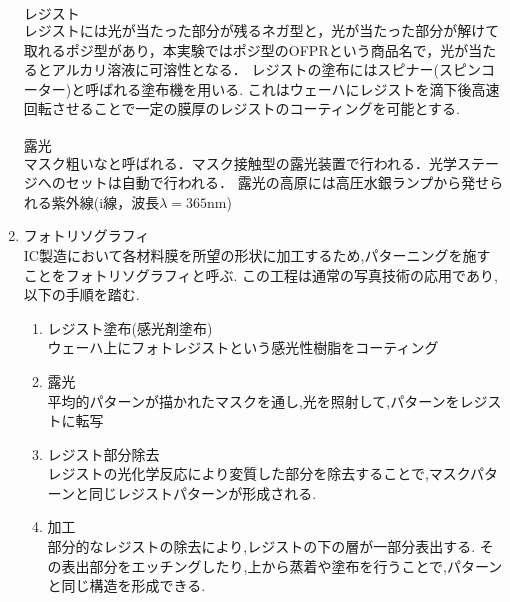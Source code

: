 \documentclass[11pt]{jarticle}
\begin{document}
\begin{enumerate}
				$\boldsymbol{レジスト}$\\
					レジストには光が当たった部分が残るネガ型と，光が当たった部分が解けて取れるポジ型があり，本実験ではポジ型のOFPRという商品名で，光が当たるとアルカリ溶液に可溶性となる．
					レジストの塗布にはスピナー(スピンコーター)と呼ばれる塗布機を用いる.
					これはウェーハにレジストを滴下後高速回転させることで一定の膜厚のレジストのコーティングを可能とする.\\
				\\
				$\boldsymbol{露光}$\\
					マスク粗いなと呼ばれる．マスク接触型の露光装置で行われる．光学ステージへのセットは自動で行われる．
					露光の高原には高圧水銀ランプから発せられる紫外線(i線，波長$\lambda = 365$nm)


			\item フォトリソグラフィ\\
				IC製造において各材料膜を所望の形状に加工するため,パターニングを施すことをフォトリソグラフィと呼ぶ.
				この工程は通常の写真技術の応用であり,以下の手順を踏む.
				\begin{enumerate}
					\item レジスト塗布(感光剤塗布)\\
						ウェーハ上にフォトレジストという感光性樹脂をコーティング
					\item 露光\\
						平均的パターンが描かれたマスクを通し,光を照射して,パターンをレジストに転写
					\item レジスト部分除去\\
						レジストの光化学反応により変質した部分を除去することで,マスクパターンと同じレジストパターンが形成される.
					\item 加工\\
						部分的なレジストの除去により,レジストの下の層が一部分表出する.
						その表出部分をエッチングしたり,上から蒸着や塗布を行うことで,パターンと同じ構造を形成できる.
				\end{enumerate}
		\end{enumerate}
\end{document}
